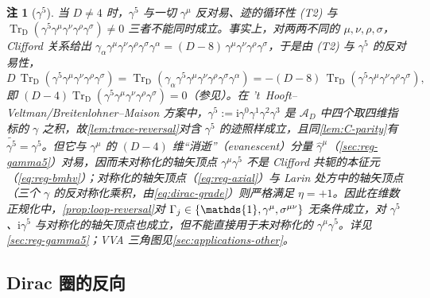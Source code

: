 \documentclass[UTF8,a4paper,11pt,fontset=fandol]{ctexart}
\let\amsmathbb\mathbb
\renewcommand{\mathbb}[1]{\ifx1#1\mathds{1}\else\amsmathbb{#1}\fi}
\theoremstyle{cplain}
\theoremstyle{cdefinition}
\theoremstyle{cremark}
\newtheorem{remark}[theorem]{注}
\numberwithin{equation}{section}
\newcommand{\TrD}{\operatorname{Tr}_{\mathrm{D}}}   %
\newcommand{\ii}{\mathrm{i}}                        %
\newcommand{\Cconj}[1]{\widetilde{#1}}              %
\begin{document}
\begin{remark}[$\gamma^5$]\label{rem:dirac-gamma5}
当 $D\neq4$ 时，$\gamma^5$ 与一切 $\gamma^\mu$ 反对易、迹的循环性 (T2) 与 $\TrD(\gamma^5\gamma^\mu\gamma^\nu\gamma^\rho\gamma^\sigma)\neq0$ 三者不能同时成立。事实上，对两两不同的 $\mu,\nu,\rho,\sigma$，Clifford 关系给出 $\gamma_\alpha\gamma^\mu\gamma^\nu\gamma^\rho\gamma^\sigma\gamma^\alpha={(D-8)}\,\gamma^\mu\gamma^\nu\gamma^\rho\gamma^\sigma$，于是由 (T2) 与 $\gamma^5$ 的反对易性，
\[
D\,\TrD(\gamma^5\gamma^\mu\gamma^\nu\gamma^\rho\gamma^\sigma)=\TrD(\gamma_\alpha\gamma^5\gamma^\mu\gamma^\nu\gamma^\rho\gamma^\sigma\gamma^\alpha)=-(D-8)\,\TrD(\gamma^5\gamma^\mu\gamma^\nu\gamma^\rho\gamma^\sigma),
\]
即 $(D-4)\TrD(\gamma^5\gamma^\mu\gamma^\nu\gamma^\rho\gamma^\sigma)=0$（参见\cite{BreitenlohnerMaison1977}）。在 \mbox{'t}~Hooft--Veltman/Breitenlohner--Maison 方案\cite{BreitenlohnerMaison1977,tHooftVeltman1972}中，$\gamma^5:=\ii\gamma^0\gamma^1\gamma^2\gamma^3$ 是 $\mathcal A_D$ 中四个取四维指标的 $\gamma$ 之积，故\cref{lem:trace-reversal}对含 $\gamma^5$ 的迹照样成立，且同\cref{lem:C-parity}有 $\Cconj{\gamma^5}=\gamma^5$。但它与 $\gamma^\mu$ 的 $(D-4)$ 维“消逝”（evanescent）分量 $\hat\gamma^\mu$（\cref{sec:reg-gamma5}）对易，因而未对称化的轴矢顶点 $\gamma^\mu\gamma^5$ 不是 Clifford 共轭的本征元（\cref{eq:reg-bmhv}）；对称化的轴矢顶点（\cref{eq:reg-axial}）与 Larin 处方\cite{Larin1993}中的轴矢顶点（三个 $\gamma$ 的反对称化乘积，由\cref{eq:dirac-grade}）则严格满足 $\eta=+1$。因此在维数正规化中，\cref{prop:loop-reversal}对 $\Gamma_j\in\{\mathbb 1,\gamma^\mu,\sigma^{\mu\nu}\}$ 无条件成立，对 $\gamma^5$、$\ii\gamma^5$ 与对称化的轴矢顶点也成立，但不能直接用于未对称化的 $\gamma^\mu\gamma^5$。详见\cref{sec:reg-gamma5}；VVA 三角图见\cref{sec:applications-other}。
\end{remark}

\subsection{Dirac 圈的反向}\label{sec:dirac-loop}
\end{document}
